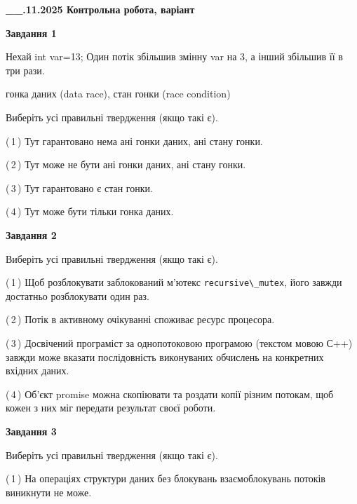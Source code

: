 \documentclass[12pt, ukrainian]{article}
\def\code#1{\Verb!#1!}
\begin{document}
\begin {large}

\textbf{\_\_.11.2025 Контрольна робота, варіант  }\par


{

\begin{center}
\textbf{Завдання 1}
\end{center}
Нехай int var=13; Один потік збільшив змінну var на 3, а інший збільшив її в три рази.

гонка даних (data race), стан гонки (race condition)

Виберіть усі правильні твердження (якщо такі є).\par
\vspace{2mm}
(\,1\,) Тут гарантовано нема ані гонки даних, ані стану гонки.%

(\,2\,) Тут може не бути ані гонки даних, ані стану гонки.%

(\,3\,) Тут гарантовано є стан гонки.%

(\,4\,) Тут може бути тільки гонка даних.%



\begin{center}
\textbf{Завдання 2}
\end{center}
Виберіть усі правильні твердження (якщо такі є).\par
\vspace{2mm}

(\,1\,) Щоб розблокувати заблокований м’ютекс \code{recursive\_mutex}, його завжди достатньо розблокувати один раз.%

(\,2\,) Потік в активному очікуванні споживає ресурс процесора.%

(\,3\,) Досвічений програміст за однопотоковою програмою (текстом мовою С++) завжди може вказати послідовність виконуваних обчислень на конкретних вхідних даних.%

(\,4\,) Об’єкт promise можна скопіювати та роздати копії різним потокам, щоб кожен з них міг передати результат своєї роботи.%



\begin{center}
\textbf{Завдання 3}
\end{center}
Виберіть усі правильні твердження (якщо такі є).\par
\vspace{2mm}

(\,1\,) На операціях структури даних без блокувань взаємоблокувань потоків виникнути не може.%

}
\end{large}
\end{document}
